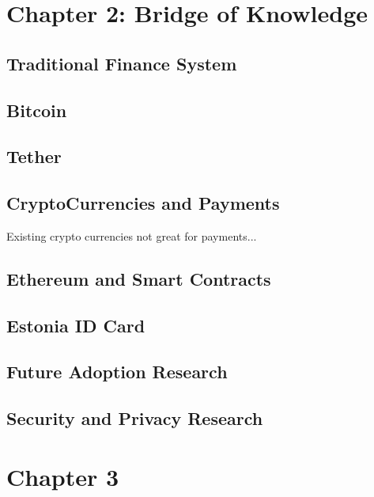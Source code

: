 \documentclass[12pt]{article} %
\begin{document}
\pagebreak

\section{Chapter 2: Bridge of Knowledge} \label{sec:2}


\subsection{Traditional Finance System}

\subsection{Bitcoin}

\subsection{Tether}

\subsection{CryptoCurrencies and Payments}
Existing crypto currencies not great for payments...

\subsection{Ethereum and Smart Contracts}

\subsection{Estonia ID Card}

\subsection{Future Adoption Research}

\subsection{Security and Privacy Research}

\pagebreak

\section{Chapter 3} \label{sec:3}
\end{document}
